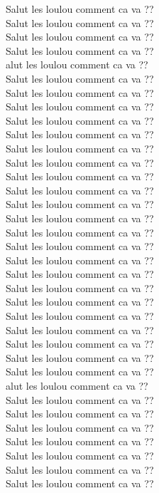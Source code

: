 Salut les loulou comment ca va ??\\
Salut les loulou comment ca va ??\\
Salut les loulou comment ca va ??\\
Salut les loulou comment ca va ??\\alut les loulou comment ca va ??\\
Salut les loulou comment ca va ??\\
Salut les loulou comment ca va ??\\
Salut les loulou comment ca va ??\\
Salut les loulou comment ca va ??\\
Salut les loulou comment ca va ??\\
Salut les loulou comment ca va ??\\
Salut les loulou comment ca va ??\\
Salut les loulou comment ca va ??\\
Salut les loulou comment ca va ??\\
Salut les loulou comment ca va ??\\
Salut les loulou comment ca va ??\\
Salut les loulou comment ca va ??\\
Salut les loulou comment ca va ??\\
Salut les loulou comment ca va ??\\
Salut les loulou comment ca va ??\\
Salut les loulou comment ca va ??\\
Salut les loulou comment ca va ??\\
Salut les loulou comment ca va ??\\
Salut les loulou comment ca va ??\\
Salut les loulou comment ca va ??\\
Salut les loulou comment ca va ??\\
Salut les loulou comment ca va ??\\alut les loulou comment ca va ??\\
Salut les loulou comment ca va ??\\
Salut les loulou comment ca va ??\\
Salut les loulou comment ca va ??\\
Salut les loulou comment ca va ??\\
Salut les loulou comment ca va ??\\
Salut les loulou comment ca va ??\\
Salut les loulou comment ca va ??\\
